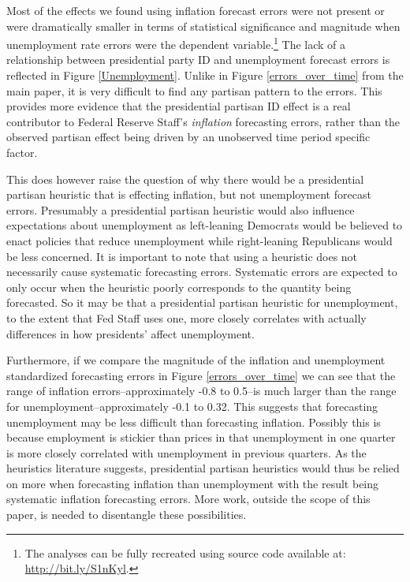 \documentclass[a4paper]{article}
\begin{document}
Most of the effects we found using inflation forecast errors were not present or were dramatically smaller in terms of statistical significance and magnitude when unemployment rate errors were the dependent variable.\footnote{The analyses can be fully recreated using source code available at: \url{http://bit.ly/S1nKyl}.} The lack of a relationship between presidential party ID and unemployment forecast errors is reflected in Figure \ref{Unemployment}. Unlike in Figure \ref{errors_over_time} from the main paper, it is very difficult to find any partisan pattern to the errors. This provides more evidence that the presidential partisan ID effect is a real contributor to Federal Reserve Staff's \emph{inflation} forecasting errors, rather than the observed partisan effect being driven by an unobserved time period specific factor.

This does however raise the question of why there would be a presidential partisan heuristic that is effecting inflation, but not unemployment forecast errors. Presumably a presidential partisan heuristic would also influence expectations about unemployment as left-leaning Democrats would be believed to enact policies that reduce unemployment while right-leaning Republicans would be less concerned. It is important to note that using a heuristic does not necessarily cause systematic forecasting errors. Systematic errors are expected to only occur when the heuristic poorly corresponds to the quantity being forecasted. So it may be that a presidential partisan heuristic for unemployment, to the extent that Fed Staff uses one, more closely correlates with actually differences in how presidents' affect unemployment.

Furthermore, if we compare the magnitude of the inflation and unemployment standardized forecasting errors in Figure \ref{errors_over_time} we can see that the range of inflation errors--approximately -0.8 to 0.5--is much larger than the range for unemployment--approximately -0.1 to 0.32. This suggests that forecasting unemployment may be less difficult than forecasting inflation. Possibly this is because employment is stickier than prices in that unemployment in one quarter is more closely correlated with unemployment in previous quarters. As the heuristics literature suggests, presidential partisan heuristics would thus be relied on more when forecasting inflation than unemployment with the result being systematic inflation forecasting errors. More work, outside the scope of this paper, is needed to disentangle these possibilities.  
\end{document}
